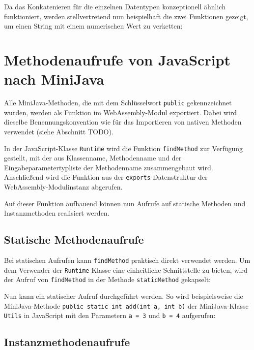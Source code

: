 Da das Konkatenieren für die einzelnen Datentypen konzeptionell ähnlich funktioniert, werden stellvertretend nun beispielhaft die zwei Funktionen gezeigt, um einen String mit einem numerischen Wert zu verketten:


\section{Methodenaufrufe von JavaScript nach MiniJava}

Alle MiniJava-Methoden, die mit dem Schlüsselwort \lstinline{public} gekennzeichnet wurden, werden als Funktion im WebAssembly-Modul exportiert. Dabei wird dieselbe Benennungskonvention wie für das Importieren von nativen Methoden verwendet (siehe Abschnitt TODO).

In der JavaScript-Klasse \lstinline{Runtime} wird die Funktion \lstinline{findMethod} zur Verfügung gestellt, mit der aus Klassenname, Methodenname und der Eingabeparametertypliste der Methodenname zusammengebaut wird. Anschließend wird die Funktion aus der \lstinline{exports}-Datenstruktur der WebAssembly-Modulinstanz abgerufen.



Auf dieser Funktion aufbauend können nun Aufrufe auf statische Methoden und Instanzmethoden realisiert werden.

\subsection{Statische Methodenaufrufe}

Bei statischen Aufrufen kann \lstinline{findMethod} praktisch direkt verwendet werden. Um dem Verwender der \lstinline{Runtime}-Klasse eine einheitliche Schnittstelle zu bieten, wird der Aufruf von \lstinline{findMethod} in der Methode \lstinline{staticMethod} gekapselt:



Nun kann ein statischer Aufruf durchgeführt werden. So wird beispielsweise die Mini\-Java-Methode \lstinline{public static int add(int a, int b)} der MiniJava-Klasse \lstinline{Utils} in Java\-Script mit den Parametern \lstinline{a = 3} und \lstinline{b = 4} aufgerufen:



\subsection{Instanzmethodenaufrufe}

